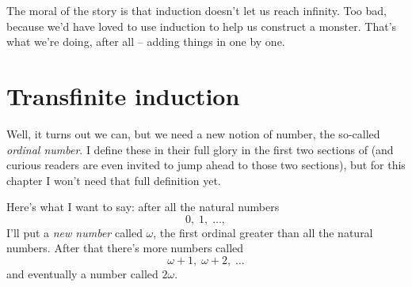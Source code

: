 The moral of the story is that induction doesn't let us reach infinity.
Too bad, because we'd have loved to use induction to help us construct a monster.
That's what we're doing, after all -- adding things in one by one.

\section{Transfinite induction}
Well, it turns out we can, but we need a new notion of number,
the so-called \emph{ordinal number}.
I define these in their full glory in the first two sections of 
(and curious readers are even invited to jump ahead to those two sections),
but for this chapter I won't need that full definition yet.

Here's what I want to say: after all the natural numbers
\[ 0, \; 1, \; \dots, \]
I'll put a \emph{new number} called $\omega$,
the first ordinal greater than all the natural numbers.
After that there's more numbers called
\[\omega+1, \; \omega+2, \; \dots \]
and eventually a number called $2\omega$.

